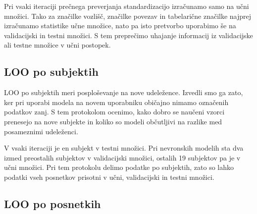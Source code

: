 Pri vsaki iteraciji prečnega preverjanja standardizacijo izračunamo samo na učni množici.
Tako za značilke vozlišč, značilke povezav in tabelarične značilke najprej izračunamo statistike učne množice, nato pa isto pretvorbo uporabimo še na validacijski in testni množici.
S tem preprečimo uhajanje informacij iz validacijske ali testne množice v učni postopek.



\subsection{LOO po subjektih}

LOO po subjektih meri posploševanje na nove udeležence.
Izvedli smo ga zato, ker pri uporabi modela na novem uporabniku običajno nimamo označenih podatkov zanj.
S tem protokolom ocenimo, kako dobro se naučeni vzorci prenesejo na nove subjekte in koliko so modeli občutljivi na razlike med posameznimi udeleženci.

V vsaki iteraciji je en subjekt v testni množici.
Pri nevronskih modelih sta dva izmed preostalih subjektov v validacijski množici, ostalih 19 subjektov pa je v učni množici.
Pri tem protokolu delimo podatke po subjektih, zato so lahko podatki vseh posnetkov prisotni v učni, validacijski in testni množici.

\subsection{LOO po posnetkih}

